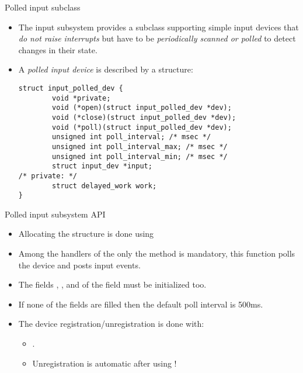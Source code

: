 \begin{frame}[fragile]{Polled input subclass}
  \begin{itemize}
  \item The input subsystem provides a subclass supporting simple input
    devices that {\em do not raise interrupts} but have to be {\em
      periodically scanned or polled} to detect changes in their
    state.
  \item A {\em polled input device} is described by a
     structure:
    \begin{block}{}
    \begin{verbatim}
struct input_polled_dev {
        void *private;
        void (*open)(struct input_polled_dev *dev);
        void (*close)(struct input_polled_dev *dev);
        void (*poll)(struct input_polled_dev *dev);
        unsigned int poll_interval; /* msec */
        unsigned int poll_interval_max; /* msec */
        unsigned int poll_interval_min; /* msec */
        struct input_dev *input;
/* private: */
        struct delayed_work work;
}
    \end{verbatim}
    \end{block}
  \end{itemize}
\end{frame}

\begin{frame}[fragile]{Polled input subsystem API}
  \begin{itemize}
  \item Allocating the  structure is
    done using 
  \item Among the handlers of the  only the
     method is mandatory, this function polls the device
    and posts input events.
  \item The fields , ,  and  of
    the  field must be initialized too.
  \item If none of the  fields are filled then the
    default poll interval is 500ms.
  \item The device registration/unregistration is done with:
    \begin{itemize}
    \item {}.
    \item Unregistration is automatic after using
      !
    \end{itemize}
  \end{itemize}
\end{frame}

